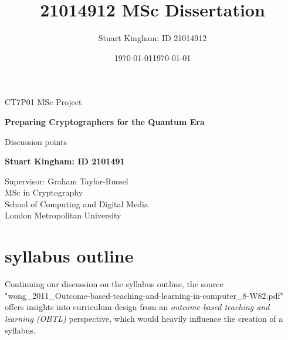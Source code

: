 \documentclass[11pt,a4paper]{article}
\author{Stuart Kingham: ID 21014912}
\title{21014912 MSc Dissertation}
\date{\today}
\begin{document}
	\doublespacing
	
	\begin{titlepage}
		\vspace*{\fill}
		\begin{center}
			\vspace*{1cm}
			
			{\LARGE CT7P01 MSc Project}
			
			
			\vspace*{1cm}
			{\large \textbf{Preparing Cryptographers for the Quantum Era}}
			
			\vspace{0.2cm}
			{\large Discussion points}
			
			
			\vfill
			
			\textbf{Stuart Kingham: ID 2101491}
			
			\vfill
			
			\vspace{0.8cm}
			
			
			Supervisor: Graham Taylor-Russel \\
			MSc in Cryptography \\
			School of Computing and Digital Media\\
			London Metropolitan University\\
			\date{\today}
			
		\end{center}
		\vspace*{\fill}
	\end{titlepage}
	
	\pagebreak
	
	
	\newpage
	
	\singlespacing 
	\tableofcontents
	\listoffigures
	\newpage
	
	\doublespacing
	

\section{syllabus outline}

	Continuing our discussion on the syllabus outline, the source \cite{Wong:2011} "wong\_2011\_Outcome-based-teaching-and-learning-in-computer\_8-W82.pdf" 
	offers insights into curriculum design from an \emph{outcome-based teaching and learning (OBTL)} perspective, 
	which would heavily influence the creation of a syllabus.
	
\end{document}
